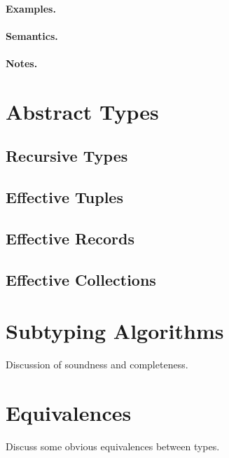 \paragraph{Examples.}

\paragraph{Semantics.}

\paragraph{Notes.}

\section{Abstract Types}
\subsection{Recursive Types}
\subsection{Effective Tuples}
\subsection{Effective Records}
\subsection{Effective Collections}

\section{Subtyping Algorithms}
Discussion of soundness and completeness.

\section{Equivalences}
Discuss some obvious equivalences between types.

